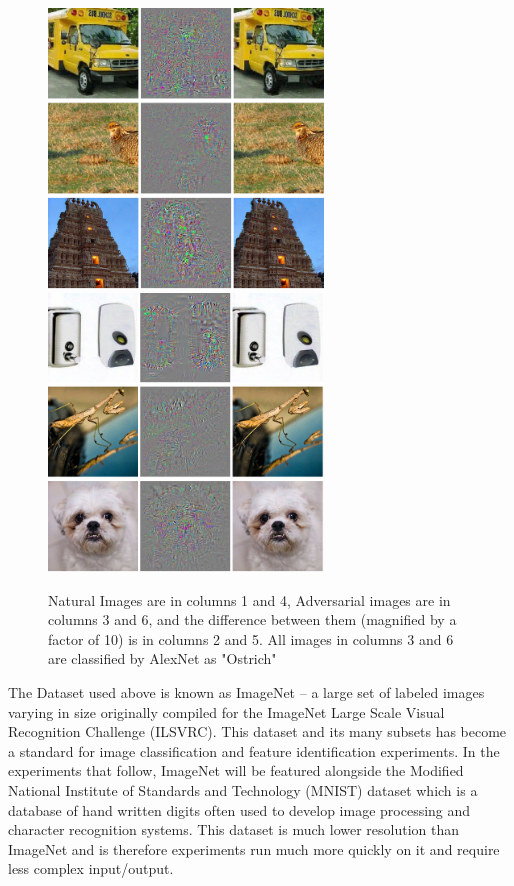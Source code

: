 \begin{figure}[t]
   \centering
\includegraphics[width=7.3cm]{negative1.png}\includegraphics[width=7.3cm]{negative2.png}
   \caption{Natural Images are in columns 1 and 4, Adversarial images are in columns 3 and 6, and the difference between them (magnified by a factor of 10) is in columns 2 and 5. All images in columns 3 and 6 are classified by AlexNet as "Ostrich" \cite{Szegedy2013}}
   \label{fig:my_label}
\end{figure}



The Dataset used above is known as ImageNet -- a large set of labeled images varying in size originally compiled for the ImageNet Large Scale Visual Recognition Challenge (ILSVRC). This dataset and its many subsets has become a standard for image classification and feature identification experiments. In the experiments that follow, ImageNet will be featured alongside the Modified National Institute of Standards and Technology (MNIST) dataset which is a database of hand written digits often used to develop image processing and character recognition systems. This dataset is much lower resolution than ImageNet and is therefore experiments run much more quickly on it and require less complex input/output.  




